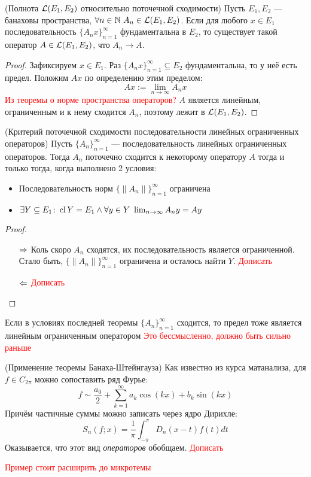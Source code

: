 \begin{theorem} (Полнота $\mathcal{L}(E_1, E_2)$ относительно поточечной сходимости)
	Пусть $E_1, E_2$ --- банаховы пространства, $\forall n \in \N\ A_n \in \cL(E_1, E_2)$. Если для любого $x \in E_1$ последовательность $\{A_nx\}_{n = 1}^\infty$ фундаментальна в $E_2$, то существует такой оператор $A \in \mathcal{L}(E_1, E_2)$, что $A_n \to A$.
\end{theorem}

\begin{proof}
	Зафиксируем $x \in E_1$. Раз $\{A_nx\}_{n = 1}^\infty \subseteq E_2$ фундаментальна, то у неё есть предел. Положим $Ax$ по определению этим пределом:
	\[
		Ax := \lim_{n \to \infty} A_nx
	\]
	\textcolor{red}{Из теоремы о норме пространства операторов?} $A$ является линейным, ограниченным и к нему сходится $A_n$, поэтому лежит в $\mathcal{L}(E_1, E_2)$.
\end{proof}

\begin{theorem} (Критерий поточечной сходимости последовательности линейных ограниченных операторов)
	Пусть $\{A_n\}_{n = 1}^\infty$ --- последовательность линейных ограниченных операторов. Тогда $A_n$ поточечно сходится к некоторому оператору $A$ тогда и только тогда, когда выполнено 2 условия:
	\begin{itemize}
		\item Последовательность норм $\{\|A_n\|\}_{n = 1}^\infty$ ограничена
		
		\item $\exists Y \subseteq E_1 \colon \operatorname{cl} Y = E_1 \wedge \forall y \in Y\ \lim_{n \to \infty} A_ny = Ay$
	\end{itemize}
\end{theorem}

\begin{proof}
	\begin{itemize}
		\item[$\Rightarrow$] Коль скоро $A_n$ сходятся, их последовательность является ограниченной. Стало быть, $\{\|A_n\|\}_{n = 1}^\infty$ ограничена и осталось найти $Y$. \textcolor{red}{Дописать}
		
		\item[$\Leftarrow$] \textcolor{red}{Дописать}
	\end{itemize}
\end{proof}

\begin{corollary}
	Если в условиях последней теоремы $\{A_n\}_{n = 1}^\infty$ сходится, то предел тоже является линейным ограниченным оператором \textcolor{red}{Это бессмысленно,  должно быть сильно раньше}
\end{corollary}

\begin{example} (Применение теоремы Банаха-Штейнгауза)
	Как известно из курса матанализа, для $f \in C_{2\pi}$ можно сопоставить ряд Фурье:
	\[
		f \sim \frac{a_0}{2} + \sum_{k = 1}^\infty a_k\cos(kx) + b_k\sin(kx)
	\]
	Причём частичные суммы можно записать через ядро Дирихле:
	\[
		S_n(f; x) = \frac{1}{\pi}\int_{-\pi}^\pi D_n(x - t)f(t)dt
	\]
	Оказывается, что этот вид \textit{операторов} обобщаем. \textcolor{red}{Дописать}
\end{example}

\textcolor{red}{Пример стоит расширить до микротемы}